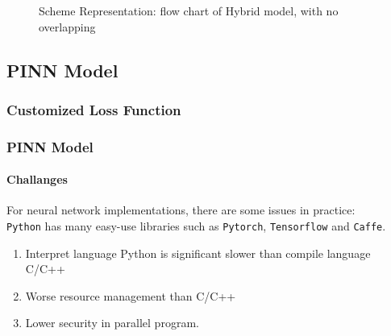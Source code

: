 \begin{frame}
\begin{figure}[htbp]
\begin{tikzpicture}[scale=0.6, transform shape]



    \end{tikzpicture}
    \caption{Scheme Representation: flow chart of Hybrid model, with no overlapping}
  \end{figure}
\end{frame}



\subsection{PINN Model}

\subsubsection{Customized Loss Function}

\begin{frame}
  \frametitle{PINN Model}
  \framesubtitle{Challanges}
  For neural network implementations, there are some issues in practice:\\
  \texttt{Python} has many easy-use libraries such as \texttt{Pytorch}, \texttt{Tensorflow} and \texttt{Caffe}.
  \begin{enumerate}
    \item Interpret language Python is significant slower than compile language C/C++
    \item Worse resource management than C/C++
    \item Lower security in parallel program.
  \end{enumerate}
\end{frame}


